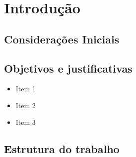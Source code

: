 \chapter{Introdução}

\section{Considerações Iniciais}

\section{Objetivos e justificativas}

\begin{itemize}
\item Item 1
\item Item 2
\item Item 3
\end{itemize}


\section{Estrutura do trabalho}

